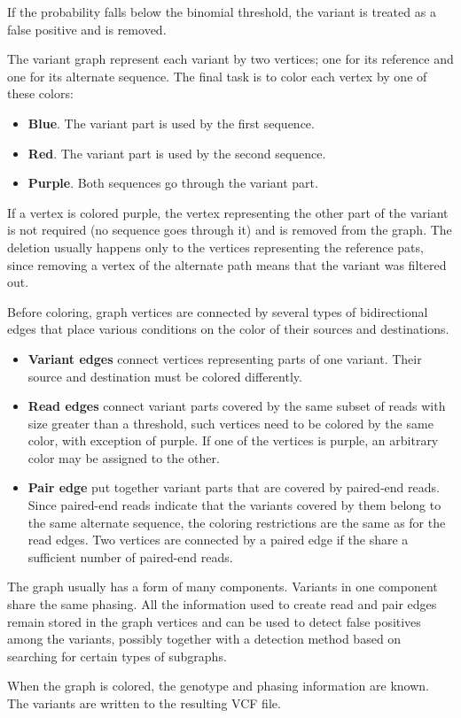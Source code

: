 If the probability falls below the binomial threshold, the variant is treated as a false positive and is removed.

The variant graph represent each variant by two vertices; one for its reference and one for its alternate sequence. The final task is to color each vertex by one of these colors:
\begin{itemize}
\item \textbf{Blue}. The variant part is used by the first sequence.
\item \textbf{Red}. The variant part is used by the second sequence.
\item \textbf{Purple}. Both sequences go through the variant part.
\end{itemize}

If a vertex is colored purple, the vertex representing the other part of the variant is not required (no sequence goes through it) and is removed from the graph. The deletion usually happens only to the vertices representing the reference pats, since removing a vertex of the alternate path means that the variant was filtered out.

Before coloring, graph vertices are connected by several types of bidirectional edges that place various conditions on the color of their sources and destinations.
\begin{itemize}
\item \textbf{Variant edges} connect vertices representing parts of one variant. Their source and destination must be colored differently.
\item \textbf{Read edges} connect variant parts covered by the same subset of reads with size greater than a threshold, such vertices need to be colored by the same color, with exception of purple. If one of the vertices is purple, an arbitrary color may be assigned
to the other.
\item \textbf{Pair edge} put together variant parts that are covered by paired-end reads. Since paired-end reads indicate that the variants covered by them belong to the same alternate sequence, the coloring restrictions are the same as for the read edges. Two vertices are connected by a paired edge if the share a sufficient number of paired-end reads.
\end{itemize}

The graph usually has a form of many components. Variants in one component share the same phasing. All the information used to create read and pair edges remain stored in the graph vertices and can be used to detect false positives among the variants, possibly together with a detection method based on searching for certain types of subgraphs.

When the graph is colored, the genotype and phasing information are known. The variants are written to the resulting VCF file.